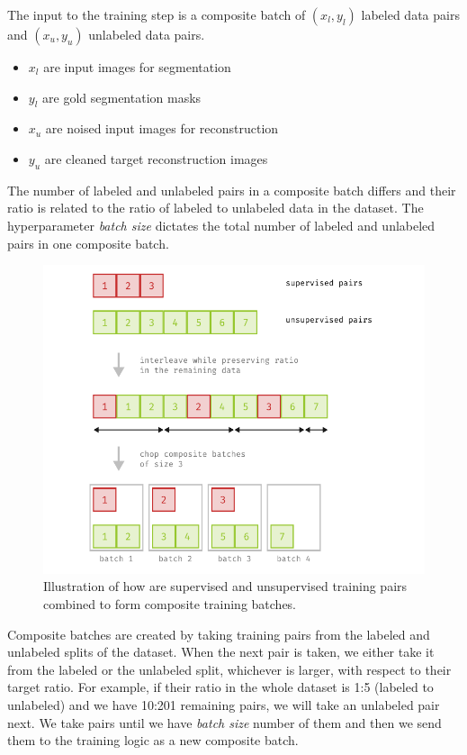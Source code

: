 The input to the training step is a composite batch of $(x_l, y_l)$ labeled data pairs and $(x_u, y_u)$ unlabeled data pairs.

\begin{itemize}
    \item $x_l$ are input images for segmentation
    \item $y_l$ are gold segmentation masks
    \item $x_u$ are noised input images for reconstruction
    \item $y_u$ are cleaned target reconstruction images
\end{itemize}

The number of labeled and unlabeled pairs in a composite batch differs and their ratio is related to the ratio of labeled to unlabeled data in the dataset. The hyperparameter \emph{batch size} dictates the total number of labeled and unlabeled pairs in one composite batch.

\begin{figure}[ht]
    \centering
    \includegraphics[width=140mm]{../img/batching-process.pdf}
    \caption{Illustration of how are supervised and unsupervised training pairs combined to form composite training batches.}
    \label{fig:CompositeBatching}
\end{figure}

Composite batches are created by taking training pairs from the labeled and unlabeled splits of the dataset. When the next pair is taken, we either take it from the labeled or the unlabeled split, whichever is larger, with respect to their target ratio. For example, if their ratio in the whole dataset is 1:5 (labeled to unlabeled) and we have 10:201 remaining pairs, we will take an unlabeled pair next. We take pairs until we have \emph{batch size} number of them and then we send them to the training logic as a new composite batch.

